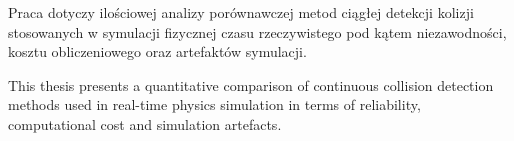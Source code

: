
\begin{abstracts}
  \AbstractPL
	Praca dotyczy ilościowej analizy porównawczej metod ciągłej detekcji kolizji stosowanych w symulacji fizycznej czasu rzeczywistego pod kątem niezawodności, kosztu obliczeniowego oraz artefaktów symulacji.
		
	\AbstractENG
	This thesis presents a quantitative comparison of continuous collision detection methods used in real-time physics simulation in terms of reliability, computational cost and simulation artefacts.
\end{abstracts}

